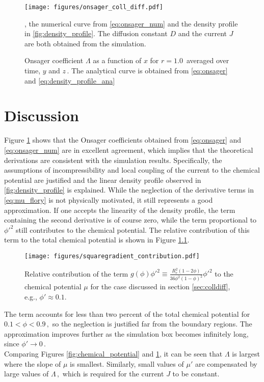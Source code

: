 \documentclass[bachelor,       %
               twoside,        %
               BCOR10mm,       %
                ngerman,english  %
               ]{GAUBM}
\begin{document}
\begin{figure}[h]
  \centering
  \texttt{[image: figures/onsager\_coll\_diff.pdf]}
  \caption{Onsager coefficient $\Lambda$ as a function of $x$ for $r=1.0\,$ averaged over time, $y$ and $z\,$. The analytical curve is obtained from \eqref{eq:onsager} and \eqref{eq:density_profile_ana}}, the numerical curve from \eqref{eq:onsager_num} and the density profile in \ref{fig:density_profile}. The diffusion constant $D$ and the current $J$ are both obtained from the simulation.
  \label{fig:onsager_coeff}
\end{figure}





\chapter{Discussion}
\label{chap:discussion}

Figure \ref{fig:onsager_coeff} shows that the Onsager coefficients obtained from \eqref{eq:onsager} and \eqref{eq:onsager_num} are in excellent agreement, which implies that the theoretical derivations are consistent with the simulation results. Specifically, the assumptions of incompressibility and local coupling of the current to the chemical potential are justified and the linear density profile observed in \ref{fig:density_profile} is explained. While the neglection of the derivative terms in \eqref{eq:mu_flory} is not physically motivated, it still represents a good approximation. If one accepts the linearity of the density profile, the term containing the second derivative is of course zero, while the term proportional to $\phi'^2$ still contributes to the chemical potential. The relative contribution of this term to the total chemical potential is shown in  Figure \ref{fig:squaregradient_contribution}. 



\begin{figure}[h]
  \centering
  \texttt{[image: figures/squaregradient\_contribution.pdf]}
  \caption{Relative contribution of the term $g(\phi)\phi'^2\equiv\frac{R_e^2(1-2\phi)}{36\phi^2(1-\phi)^2}\phi'^2$ to the chemical potential $\mu$ for the case discussed in section \ref{sec:colldiff}, e.g., $\phi'\approx 0.1$. }
  \label{fig:squaregradient_contribution}
\end{figure}

The term accounts for less than two percent of the total chemical potential for $0.1<\phi<0.9\,,$ so the neglection is justified far from the boundary regions. The approximation improves further as the simulation box becomes infinitely long, since $\phi'\rightarrow0\,.$\\
Comparing Figures \ref{fig:chemical_potential} and \ref{fig:onsager_coeff}, it can be seen that $\Lambda$ is largest where the slope of $\mu$ is smallest. Similarly, small values of $\mu'$ are compensated by large values of $\Lambda\,,$ which is required for the current $J$ to be constant.
\end{document}
